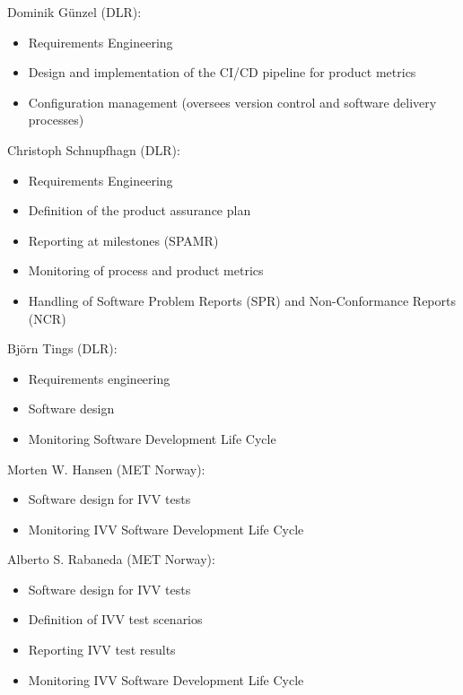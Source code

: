 
\noindent Dominik Günzel (DLR):
\begin{itemize}
    \item Requirements Engineering
    \item Design and implementation of the CI/CD pipeline for product metrics
    \item Configuration management (oversees version control and software delivery processes)
\end{itemize}

\noindent Christoph Schnupfhagn (DLR):
\begin{itemize}
    \item Requirements Engineering
    \item Definition of the product assurance plan
    \item Reporting at milestones (SPAMR)
    \item Monitoring of process and product metrics
    \item Handling of Software Problem Reports (SPR) and Non-Conformance Reports (NCR)
\end{itemize}

\noindent Björn Tings (DLR):
\begin{itemize}
    \item Requirements engineering 
    \item Software design
    \item Monitoring Software Development Life Cycle
\end{itemize}

\noindent Morten W. Hansen (MET Norway):
\begin{itemize}
    \item Software design for IVV tests
    \item Monitoring IVV Software Development Life Cycle
\end{itemize}

\noindent Alberto S. Rabaneda (MET Norway):
\begin{itemize}
    \item Software design for IVV tests 
    \item Definition of IVV test scenarios
    \item Reporting IVV test results
    \item Monitoring IVV Software Development Life Cycle
\end{itemize}

